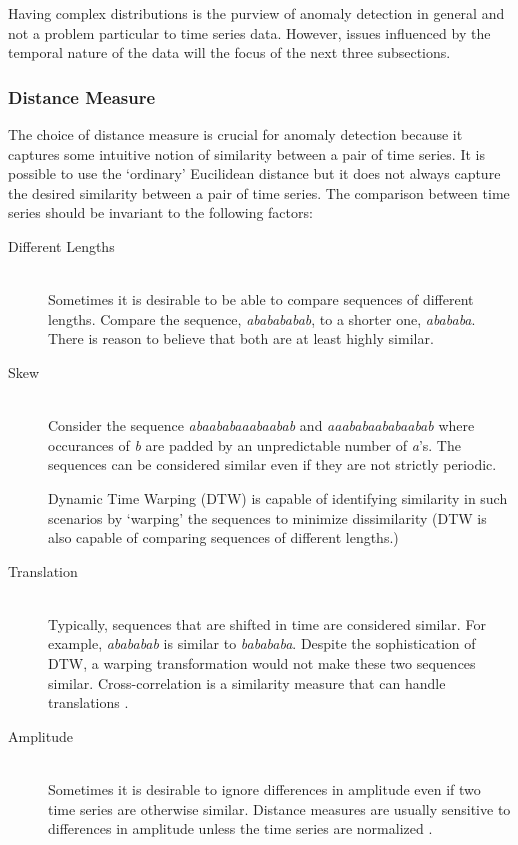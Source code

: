 Having complex distributions is the purview of anomaly detection in general and not a problem particular to time series data. However, issues influenced by the temporal nature of the data will the focus of the next three subsections.

\subsubsection{Distance Measure}

The choice of distance measure is crucial for anomaly detection because it captures some intuitive notion of similarity between a pair of time series. It is possible to use the `ordinary' Eucilidean distance \cite{Keogh2002} but it does not always capture the desired similarity between a pair of time series. The comparison between time series should be invariant to the following factors:

\begin{description}

\item[Different Lengths] \hfill \\

Sometimes it is desirable to be able to compare sequences of different lengths. Compare the sequence, \emph{ababababab}, to a shorter one, \emph{abababa}. There is reason to believe that both are at least highly similar.

\item[Skew] \hfill \\

Consider the sequence \emph{abaababaaabaabab} and \emph{aaababaababaabab} where occurances of \emph{b} are padded by an unpredictable number of \emph{a}'s. The sequences can be considered similar even if they are not strictly periodic.

Dynamic Time Warping (DTW) \cite{Keogh2002} is capable of identifying similarity in such scenarios by `warping' the sequences to minimize dissimilarity (DTW is also capable of comparing sequences of different lengths.)

\item[Translation] \hfill \\

Typically, sequences that are shifted in time are considered similar. For example, \emph{abababab} is similar to \emph{babababa}. Despite the sophistication of DTW, a warping transformation would not make these two sequences similar.  Cross-correlation is a similarity measure that can handle translations \cite{Protopapas2005}.

\item[Amplitude] \hfill \\

Sometimes it is desirable to ignore differences in amplitude even if two time series are otherwise similar. Distance measures are usually sensitive to differences in amplitude unless the time series are normalized \cite{Keogh2002}. %

\end{description}

